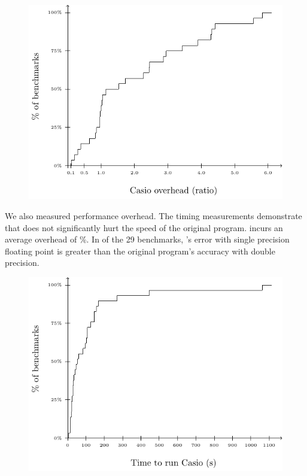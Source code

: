 \documentclass[paper.tex]{subfiles}
\begin{document}
\begin{figure}
\label{fig:eval-overhead-d}
\includegraphics[width=0.9\columnwidth]{fig/eval-overhead-d.pdf}
\caption{}
\end{figure}

 We also measured performance overhead.  The timing
measurements demonstrate that \casio does not significantly hurt the
speed of the original program.  \casio incurs an average overhead of
\%.  In  of the 29 benchmarks, \casio's error with
single precision floating point is greater than the original program's
accuracy with double precision.

\begin{figure}
\label{fig:eval-casio-time}
\includegraphics[width=0.9\columnwidth]{fig/eval-casio-time.pdf}
\caption{}
\end{figure}
\end{document}
